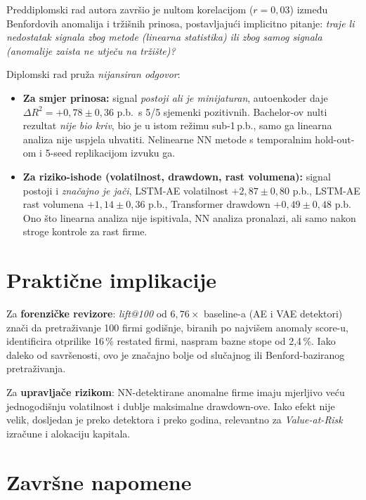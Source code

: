 \documentclass[diplomskirad,authoryear]{fer}
\begin{document}
Preddiplomski rad autora završio je nultom korelacijom ($r=0{,}03$) između Benfordovih anomalija i tržišnih prinosa, postavljajući implicitno pitanje: \emph{traje li nedostatak signala zbog metode (linearna statistika) ili zbog samog signala (anomalije zaista ne utječu na tržište)?}

Diplomski rad pruža \emph{nijansiran odgovor}:
\begin{itemize}
 \item \textbf{Za smjer prinosa:} signal \emph{postoji ali je minijaturan}, autoenkoder daje $\Delta R^2 = +0{,}78 \pm 0{,}36$ p.b.\ s 5/5 sjemenki pozitivnih. Bachelor-ov nulti rezultat \emph{nije bio kriv}, bio je u istom režimu sub-1\,p.b., samo ga linearna analiza nije uspjela uhvatiti. Nelinearne NN metode s temporalnim hold-out-om i 5-seed replikacijom izvuku ga.
 \item \textbf{Za riziko-ishode (volatilnost, drawdown, rast volumena):} signal postoji i \emph{značajno je jači}, LSTM-AE volatilnost $+2{,}87 \pm 0{,}80$ p.b., LSTM-AE rast volumena $+1{,}14 \pm 0{,}36$ p.b., Transformer drawdown $+0{,}49 \pm 0{,}48$ p.b. Ono što linearna analiza nije ispitivala, NN analiza pronalazi, ali samo nakon stroge kontrole za rast firme.
\end{itemize}

\section{Praktične implikacije}

Za \textbf{forenzičke revizore}: \emph{lift@100} od $6{,}76\times$ baseline-a (AE i VAE detektori) znači da pretraživanje 100 firmi godišnje, biranih po najvišem anomaly score-u, identificira otprilike 16\,\% restated firmi, naspram bazne stope od 2,4\,\%. Iako daleko od savršenosti, ovo je značajno bolje od slučajnog ili Benford-baziranog pretraživanja.

Za \textbf{upravljače rizikom}: NN-detektirane anomalne firme imaju mjerljivo veću jednogodišnju volatilnost i dublje maksimalne drawdown-ove. Iako efekt nije velik, dosljedan je preko detektora i preko godina, relevantno za \emph{Value-at-Risk} izračune i alokaciju kapitala.

\section{Završne napomene}
\end{document}
